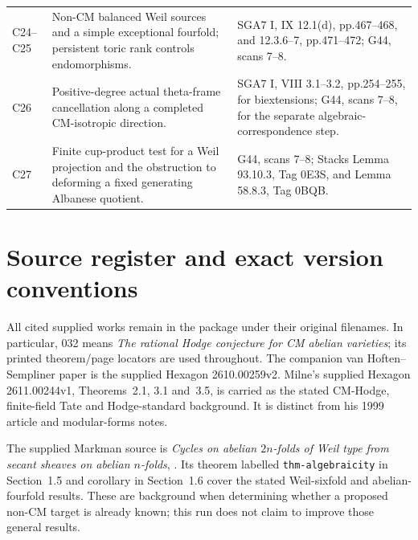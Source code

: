 \documentclass[11pt]{article}
\theoremstyle{definition}\newtheorem{definition}[theorem]{Definition}\newtheorem{remark}[theorem]{Remark}
\begin{document}
\begin{longtable}{@{}p{.18\linewidth}p{.48\linewidth}p{.27\linewidth}@{}}
C24--C25 & Non-CM balanced Weil sources and a simple exceptional fourfold; persistent toric rank controls endomorphisms. & SGA7 I, IX 12.1(d), pp.467--468, and 12.3.6--7, pp.471--472; G44, scans 7--8.\\
C26 & Positive-degree actual theta-frame cancellation along a completed CM-isotropic direction. & SGA7 I, VIII 3.1--3.2, pp.254--255, for biextensions; G44, scans 7--8, for the separate algebraic-correspondence step.\\
C27 & Finite cup-product test for a Weil projection and the obstruction to deforming a fixed generating Albanese quotient. & G44, scans 7--8; Stacks Lemma 93.10.3, Tag 0E3S, and Lemma 58.8.3, Tag 0BQB.\\
\bottomrule
\end{longtable}

\section{Source register and exact version conventions}

All cited supplied works remain in the package under their original
filenames. In particular, 032 means
\emph{The rational Hodge conjecture for CM abelian varieties}; its
printed theorem/page locators are used throughout. The companion
van Hoften--Sempliner paper is the supplied Hexagon 2610.00259v2.
Milne's supplied Hexagon 2611.00244v1, Theorems~2.1, 3.1 and~3.5,
is carried as the stated CM-Hodge, finite-field Tate and Hodge-standard
background. It is distinct from his 1999 article and modular-forms notes.

The supplied Markman source is \emph{Cycles on abelian $2n$-folds of
Weil type from secant sheaves on abelian $n$-folds},
.
Its theorem labelled \texttt{thm-algebraicity} in Section~1.5 and
corollary in Section~1.6 cover the stated Weil-sixfold and
abelian-fourfold results. These are background when determining
whether a proposed non-CM target is already known; this run does
not claim to improve those general results.
\end{document}
